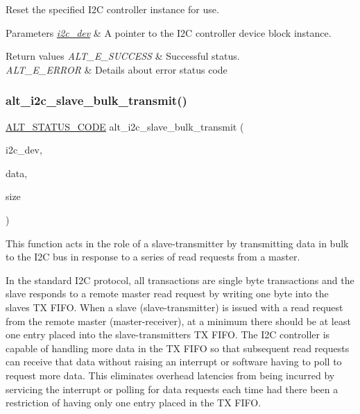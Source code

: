 Reset the specified I2C controller instance for use.


\begin{DoxyParams}{Parameters}
{\em \mbox{\hyperlink{structi2c__dev}{i2c\+\_\+dev}}} & A pointer to the I2C controller device block instance.\\
\hline
\end{DoxyParams}

\begin{DoxyRetVals}{Return values}
{\em A\+L\+T\+\_\+\+E\+\_\+\+S\+U\+C\+C\+E\+SS} & Successful status. \\
\hline
{\em A\+L\+T\+\_\+\+E\+\_\+\+E\+R\+R\+OR} & Details about error status code \\
\hline
\end{DoxyRetVals}
\mbox{\label{group__ALT__I2C_ga0328c19c0b8da8349533947b15ae291d}} 
\subsubsection{\texorpdfstring{alt\_i2c\_slave\_bulk\_transmit()}{alt\_i2c\_slave\_bulk\_transmit()}}
{\footnotesize\ttfamily \mbox{\hyperlink{hwlib_8h_abdb0d369f069723ca55d6c94bcaaaa12}{A\+L\+T\+\_\+\+S\+T\+A\+T\+U\+S\+\_\+\+C\+O\+DE}} alt\+\_\+i2c\+\_\+slave\+\_\+bulk\+\_\+transmit (\begin{DoxyParamCaption}\item[{\mbox{\hyperlink{structALT__I2C__DEV__s}{A\+L\+T\+\_\+\+I2\+C\+\_\+\+D\+E\+V\+\_\+t}} $\ast$}]{i2c\+\_\+dev,  }\item[{const void $\ast$}]{data,  }\item[{const size\+\_\+t}]{size }\end{DoxyParamCaption})}

This function acts in the role of a slave-\/transmitter by transmitting data in bulk to the I2C bus in response to a series of read requests from a master.

In the standard I2C protocol, all transactions are single byte transactions and the slave responds to a remote master read request by writing one byte into the slave\textquotesingle{}s TX F\+I\+FO. When a slave (slave-\/transmitter) is issued with a read request from the remote master (master-\/receiver), at a minimum there should be at least one entry placed into the slave-\/transmitter\textquotesingle{}s TX F\+I\+FO. The I2C controller is capable of handling more data in the TX F\+I\+FO so that subsequent read requests can receive that data without raising an interrupt or software having to poll to request more data. This eliminates overhead latencies from being incurred by servicing the interrupt or polling for data requests each time had there been a restriction of having only one entry placed in the TX F\+I\+FO.

